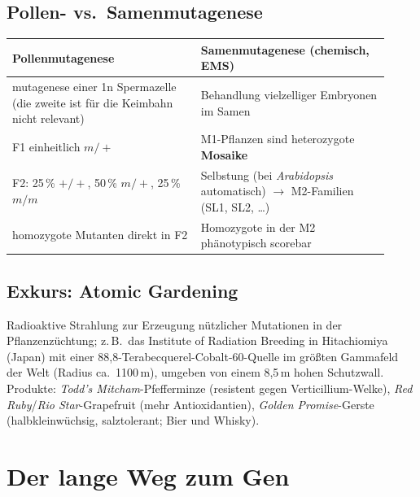 \subsection*{Pollen- vs.\ Samenmutagenese}\label{subsec:pollen--vs.-samenmutagenese}
\begin{mytable}
    \begin{tabular}{@{}|p{0.46\linewidth}|p{0.46\linewidth}|@{}}
        \hline
        \textbf{Pollenmutagenese} & \textbf{Samenmutagenese (chemisch, EMS)} \\
        \hline
        \gls{mutagenese} einer 1n Spermazelle (die zweite ist für die Keimbahn nicht relevant) & Behandlung vielzelliger Embryonen im Samen \\
        F1 einheitlich $m/+$ & M1-Pflanzen sind heterozygote \textbf{Mosaike} \\
        F2: 25\,\% $+/+$, 50\,\% $m/+$, 25\,\% $m/m$ & Selbstung (bei \emph{Arabidopsis} automatisch) $\to$ M2-Familien (SL1, SL2, \ldots) \\
        homozygote Mutanten direkt in F2 & Homozygote in der M2 phänotypisch scorebar \\
        \hline
    \end{tabular}
\end{mytable}


\subsection*{Exkurs: Atomic Gardening}\label{subsec:exkurs:-atomic-gardening}
Radioaktive Strahlung zur Erzeugung nützlicher Mutationen in der Pflanzenzüchtung; z.\,B.\ das Institute of Radiation Breeding in Hitachiomiya (Japan) mit einer 88,8-Terabecquerel-Cobalt-60-Quelle im grö{\ss}ten Gammafeld der Welt (Radius ca.\ 1100\,m), umgeben von einem 8,5\,m hohen Schutzwall.
Produkte: \emph{Todd's Mitcham}-Pfefferminze (resistent gegen Verticillium-Welke), \emph{Red Ruby}/\emph{Rio Star}-Grapefruit (mehr Antioxidantien), \emph{Golden Promise}-Gerste (halbkleinwüchsig, salztolerant; Bier und Whisky).


\section{Der lange Weg zum Gen}\label{sec:der-lange-weg-zum-gen}

